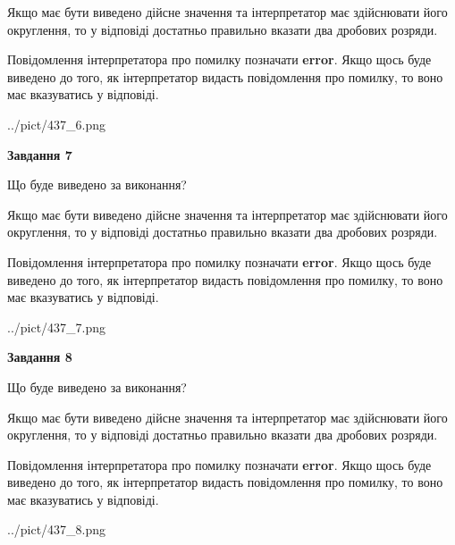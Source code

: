 \documentclass[12pt, ukrainian]{article}
\begin{document}
{\begin {Large}
Якщо має бути виведено дійсне значення та інтерпретатор має здійснювати його округлення, 
то у відповіді достатньо правильно вказати два дробових розряди.

Повідомлення інтерпретатора про помилку позначати \textbf{error}.
Якщо щось буде виведено до того, як інтерпретатор видасть повідомлення про помилку, 
то воно має вказуватись у відповіді. \par

\begin{center}
	{../pict/437_6.png}
\end{center}
\newpage

{\begin {center}\textbf{Завдання 7}\end {center}}\par
Що буде виведено за виконання? \par

Якщо має бути виведено дійсне значення та інтерпретатор має здійснювати його округлення, 
то у відповіді достатньо правильно вказати два дробових розряди.

Повідомлення інтерпретатора про помилку позначати \textbf{error}.
Якщо щось буде виведено до того, як інтерпретатор видасть повідомлення про помилку, 
то воно має вказуватись у відповіді. \par

\begin{center}
	{../pict/437_7.png}
\end{center}
\newpage

{\begin {center}\textbf{Завдання 8}\end {center}}\par
Що буде виведено за виконання? \par

Якщо має бути виведено дійсне значення та інтерпретатор має здійснювати його округлення, 
то у відповіді достатньо правильно вказати два дробових розряди.

Повідомлення інтерпретатора про помилку позначати \textbf{error}.
Якщо щось буде виведено до того, як інтерпретатор видасть повідомлення про помилку, 
то воно має вказуватись у відповіді. \par

\begin{center}
	{../pict/437_8.png}
\end{center}
\newpage


\end{Large}}
\end{document}
